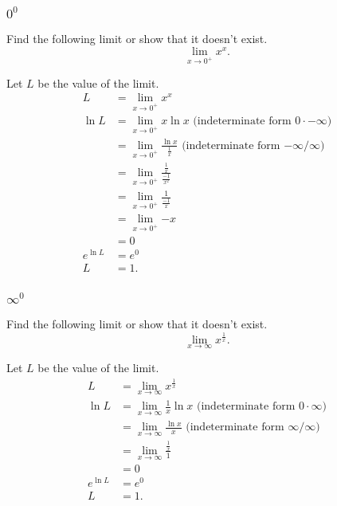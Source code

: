 \subsubsection{$0^0$}
\begin{example}
	Find the following limit or show that it doesn't exist.
	\begin{equation*}
		\lim_{x\to 0^+}{x^x}.
	\end{equation*}
\end{example}
\begin{answer}
	Let $L$ be the value of the limit.
	\begin{align*}
		L &= \lim_{x\to 0^+}{x^x} \\
		\ln{L} &= \lim_{x\to 0^+}{x\ln{x}} \text{ (indeterminate form $0\cdot-\infty$)} \\
		&= \lim_{x\to 0^+}{\frac{\ln{x}}{\frac{1}{x}}} \text{ (indeterminate form $-\infty/\infty$)} \\
		&= \lim_{x\to 0^+}{\frac{\frac{1}{x}}{\frac{-1}{x^2}}} \\
		&= \lim_{x\to 0^+}{\frac{1}{\frac{-1}{x}}} \\
		&= \lim_{x\to 0^+}{-x} \\
		&= 0 \\
		e^{\ln{L}} &= e^0 \\
		L &= 1.
	\end{align*}
\end{answer}

\subsubsection{$\infty^0$}
\begin{example}
	Find the following limit or show that it doesn't exist.
	\begin{equation*}
		\lim_{x\to\infty}{x^{\frac{1}{x}}}.
	\end{equation*}
\end{example}
\begin{answer}
	Let $L$ be the value of the limit.
	\begin{align*}
		L &= \lim_{x\to\infty}{x^{\frac{1}{x}}} \\
		\ln{L} &= \lim_{x\to\infty}{\frac{1}{x}\ln{x}} \text{ (indeterminate form $0\cdot\infty$)} \\
		&= \lim_{x\to\infty}{\frac{\ln{x}}{x}} \text{ (indeterminate form $\infty/\infty$)} \\
		&= \lim_{x\to\infty}{\frac{\frac{1}{x}}{1}} \\
		&= 0 \\
		e^{\ln{L}} &= e^0 \\
		L &= 1.
	\end{align*}
\end{answer}